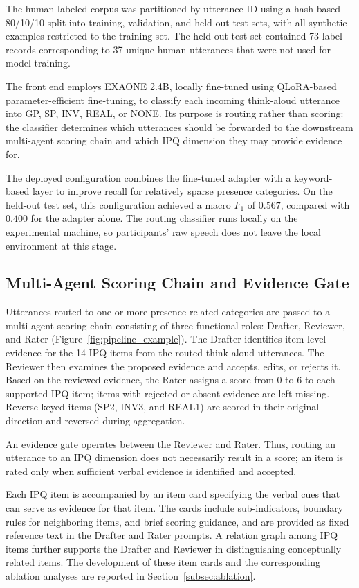 The human-labeled corpus was partitioned by utterance ID using a hash-based 80/10/10 split into training, validation, and held-out test sets, with all synthetic examples restricted to the training set. The held-out test set contained 73 label records corresponding to 37 unique human utterances that were not used for model training.

The front end employs EXAONE 2.4B, locally fine-tuned using QLoRA-based parameter-efficient fine-tuning, to classify each incoming think-aloud utterance into GP, SP, INV, REAL, or NONE. Its purpose is routing rather than scoring: the classifier determines which utterances should be forwarded to the downstream multi-agent scoring chain and which IPQ dimension they may provide evidence for.

The deployed configuration combines the fine-tuned adapter with a keyword-based layer to improve recall for relatively sparse presence categories. On the held-out test set, this configuration achieved a macro $F_1$ of $0.567$, compared with $0.400$ for the adapter alone. The routing classifier runs locally on the experimental machine, so participants' raw speech does not leave the local environment at this stage.


\subsection{Multi-Agent Scoring Chain and Evidence Gate}

Utterances routed to one or more presence-related categories are passed to a multi-agent scoring chain consisting of three functional roles: Drafter, Reviewer, and Rater (Figure~\ref{fig:pipeline_example}). The Drafter identifies item-level evidence for the 14 IPQ items from the routed think-aloud utterances. The Reviewer then examines the proposed evidence and accepts, edits, or rejects it. Based on the reviewed evidence, the Rater assigns a score from 0 to 6 to each supported IPQ item; items with rejected or absent evidence are left missing. Reverse-keyed items (SP2, INV3, and REAL1) are scored in their original direction and reversed during aggregation.

An evidence gate operates between the Reviewer and Rater. Thus, routing an utterance to an IPQ dimension does not necessarily result in a score; an item is rated only when sufficient verbal evidence is identified and accepted.

Each IPQ item is accompanied by an item card specifying the verbal cues that can serve as evidence for that item. The cards include sub-indicators, boundary rules for neighboring items, and brief scoring guidance, and are provided as fixed reference text in the Drafter and Rater prompts. A relation graph among IPQ items further supports the Drafter and Reviewer in distinguishing conceptually related items. The development of these item cards and the corresponding ablation analyses are reported in Section~\ref{subsec:ablation}.


